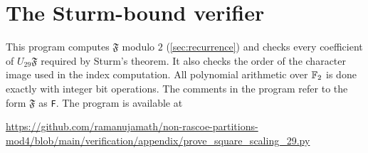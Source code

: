 \section{The Sturm-bound verifier}\label{app:sturm}

This program computes $\mathfrak F$ modulo $2$ (\cref{sec:recurrence}) and checks
every coefficient of $U_{29}\mathfrak F$ required by Sturm's theorem. It also checks
the order of the character image used in the index computation. All polynomial
arithmetic over $\mathbb{F}_2$ is done exactly with integer bit operations. The
comments in the program refer to the form $\mathfrak F$ as \texttt{F}. The
program is available at
\begin{center}
\url{https://github.com/ramanujamath/non-rascoe-partitions-mod4/blob/main/verification/appendix/prove_square_scaling_29.py}
\end{center}
